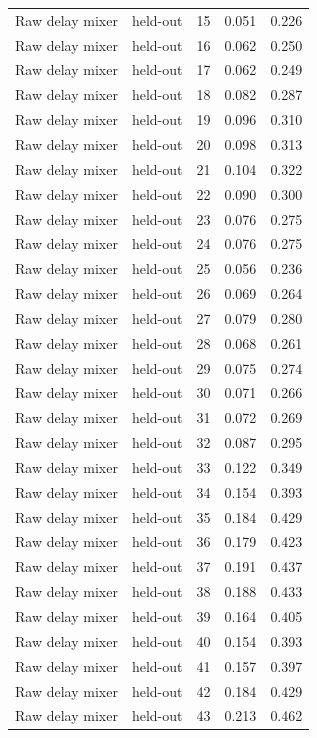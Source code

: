 \begin{tabular}{llrrr}
Raw delay mixer & held-out & 15 & 0.051 & 0.226 \\
Raw delay mixer & held-out & 16 & 0.062 & 0.250 \\
Raw delay mixer & held-out & 17 & 0.062 & 0.249 \\
Raw delay mixer & held-out & 18 & 0.082 & 0.287 \\
Raw delay mixer & held-out & 19 & 0.096 & 0.310 \\
Raw delay mixer & held-out & 20 & 0.098 & 0.313 \\
Raw delay mixer & held-out & 21 & 0.104 & 0.322 \\
Raw delay mixer & held-out & 22 & 0.090 & 0.300 \\
Raw delay mixer & held-out & 23 & 0.076 & 0.275 \\
Raw delay mixer & held-out & 24 & 0.076 & 0.275 \\
Raw delay mixer & held-out & 25 & 0.056 & 0.236 \\
Raw delay mixer & held-out & 26 & 0.069 & 0.264 \\
Raw delay mixer & held-out & 27 & 0.079 & 0.280 \\
Raw delay mixer & held-out & 28 & 0.068 & 0.261 \\
Raw delay mixer & held-out & 29 & 0.075 & 0.274 \\
Raw delay mixer & held-out & 30 & 0.071 & 0.266 \\
Raw delay mixer & held-out & 31 & 0.072 & 0.269 \\
Raw delay mixer & held-out & 32 & 0.087 & 0.295 \\
Raw delay mixer & held-out & 33 & 0.122 & 0.349 \\
Raw delay mixer & held-out & 34 & 0.154 & 0.393 \\
Raw delay mixer & held-out & 35 & 0.184 & 0.429 \\
Raw delay mixer & held-out & 36 & 0.179 & 0.423 \\
Raw delay mixer & held-out & 37 & 0.191 & 0.437 \\
Raw delay mixer & held-out & 38 & 0.188 & 0.433 \\
Raw delay mixer & held-out & 39 & 0.164 & 0.405 \\
Raw delay mixer & held-out & 40 & 0.154 & 0.393 \\
Raw delay mixer & held-out & 41 & 0.157 & 0.397 \\
Raw delay mixer & held-out & 42 & 0.184 & 0.429 \\
Raw delay mixer & held-out & 43 & 0.213 & 0.462 \\

\end{tabular}
